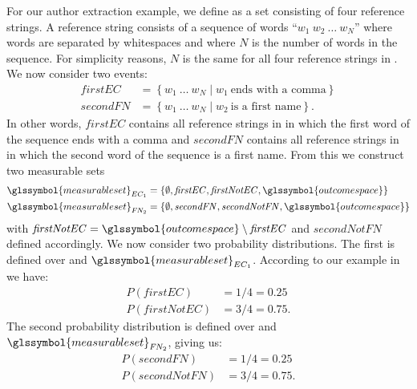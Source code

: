 For our author extraction example, we define  as a set consisting of four reference strings.
A reference string consists of a sequence of words ``$w_1\ w_2\ \dots\ w_N$'' where words are separated by whitespaces and where $N$ is the number of words in the sequence.
For simplicity reasons, $N$ is the same for all four reference strings in .
We now consider two events:
\begin{equation*}
  \begin{split}
    \mathit{firstEC}&=\left\{w_1\ \dots\ w_N \mid w_1\ \text{ends with a comma}\right\}\\
    \mathit{secondFN}&=\left\{w_1\ \dots\ w_N \mid w_2\ \text{is a first name}\right\}.
  \end{split}
\end{equation*}
In other words, $\mathit{firstEC}$ contains all reference strings in  in which the first word of the sequence ends with a comma and $\mathit{secondFN}$ contains all reference strings in  in which the second word of the sequence is a first name.
From this we construct two \glspl{measurable set}
\begin{equation*}
\begin{split}
  \glssymbol{measurable set}_{EC_1}&= \left\{\emptyset,\mathit{firstEC}, \mathit{firstNotEC}, \glssymbol{outcome space}\right\}\\
  \glssymbol{measurable set}_{F\rs N_2}&= \left\{\emptyset,\mathit{secondFN}, \mathit{secondNotFN}, \glssymbol{outcome space}\right\}
\end{split}
\end{equation*}
with $\mathit{firstNotEC}=\glssymbol{outcome space}\setminus \mathit{firstEC}$ and $\mathit{secondNotFN}$ defined accordingly.
We now consider two \glspl{probability distribution}.
The first is defined over  and $\glssymbol{measurable set}_{EC_1}$.
According to our example in  we have:
\begin{equation*}
    \begin{split}
      P(\mathit{firstEC})&=1/4=0.25\\
      P(\mathit{firstNotEC})&=3/4=0.75.
    \end{split}
\end{equation*}
The second \gls{probability distribution} is defined over  and $\glssymbol{measurable set}_{F\rs N_2}$, giving us:
\begin{equation*}
  \label{equ:eg-measurable-sets}
    \begin{split}
      P(\mathit{secondFN})&=1/4=0.25\\
      P(\mathit{secondNotFN})&=3/4=0.75.
    \end{split}
\end{equation*}

